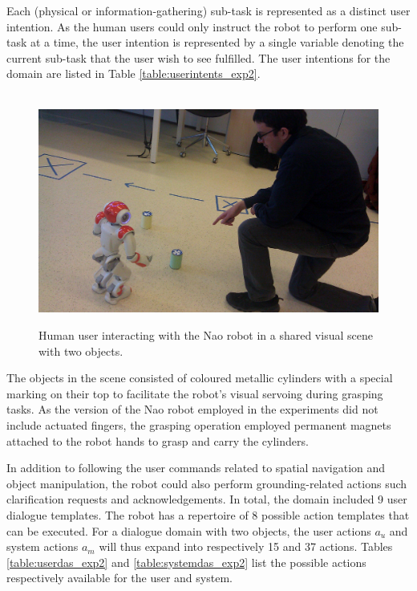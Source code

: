 Each (physical or information-gathering) sub-task is represented as a distinct user intention. As the human users could only instruct the robot to perform one sub-task at a time, the user intention is represented by a single variable denoting the current sub-task that the user wish to see fulfilled.  The user intentions for the domain are listed in Table \ref{table:userintents_exp2}. 

\begin{figure}[h]
$\phantom{a}$ \\[2mm]
\centering
\includegraphics[scale=0.12]{imgs/jonathon2.jpg}
\caption{Human user interacting with the Nao robot in a shared visual scene with two objects.}
\label{fig:naochap6}
\end{figure}

The objects in the scene consisted of coloured metallic cylinders with a special marking on their top to facilitate the robot's visual servoing during grasping tasks.  As the version of the Nao robot employed in the experiments did not include actuated fingers, the grasping operation employed permanent magnets attached to the robot hands to grasp and carry the cylinders.

In addition to following the user commands related to spatial navigation and object manipulation, the robot could also perform grounding-related actions such clarification requests and acknowledgements. In total, the domain included 9 user dialogue templates.  The robot has a repertoire of 8 possible action templates that can be executed.  For a dialogue domain with two objects, the user actions $a_u$ and system actions $a_m$ will thus expand into respectively 15 and 37 actions.  Tables \ref{table:userdas_exp2} and \ref{table:systemdas_exp2} list the possible actions respectively available for the user and system.

